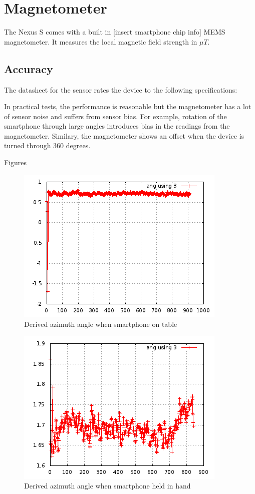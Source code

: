 \section{Magnetometer}

The Nexus S comes with a built in [insert smartphone chip info] MEMS magnetometer.
It measures the local magnetic field strength in $\mu T$.

\subsection{Accuracy}

The datasheet for the sensor rates the device to the following specifications:

In practical tests, the performance is reasonable but the magnetometer has a 
lot of sensor noise and suffers from sensor bias. For example, rotation of 
the smartphone through large angles introduces bias in the readings from the 
magnetometer. Similary, the magnetometer shows an offset when the device is 
turned through 360 degrees.

Figures 

\begin{figure}\centering
    \includegraphics{figures/angle_stationary_table.png}
    \caption{Derived azimuth angle when smartphone on table}
\end{figure}

\begin{figure}\centering
    \includegraphics{figures/angle_handheld_standing.png}
    \caption{Derived azimuth angle when smartphone held in hand}
\end{figure}


